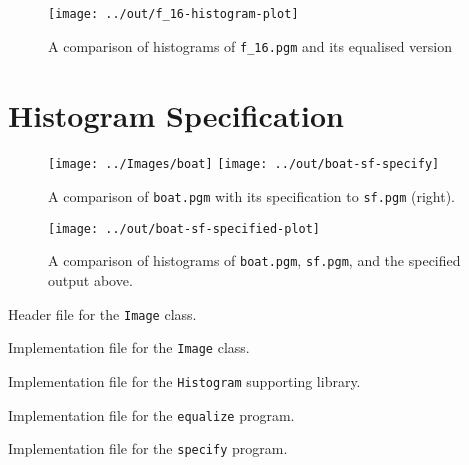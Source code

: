 \documentclass[headings=optiontoheadandtoc,listof=totoc]{scrartcl}
\newenvironment{longlisting}{\captionsetup{type=listing}}{}
\begin{document}
\begin{figure}[H]
	\centering\texttt{[image: ../out/f\_16-histogram-plot]}
	\caption{A comparison of histograms of \texttt{f\_16.pgm} and its equalised version}
\end{figure}

\section{Histogram Specification}

\begin{figure}[H]
	\centering
	\texttt{[image: ../Images/boat]}
	\texttt{[image: ../out/boat-sf-specify]}
	\caption{A comparison of \texttt{boat.pgm} with its specification to \texttt{sf.pgm} (right).}
\end{figure}

\begin{figure}[H]
	\centering\texttt{[image: ../out/boat-sf-specified-plot]}
	\caption{A comparison of histograms of \texttt{boat.pgm}, \texttt{sf.pgm}, and the specified output above.}
\end{figure}

\clearpage
\listoflistings

\begin{longlisting}
	\caption{Header file for the \texttt{Image} class.}
\end{longlisting}

\begin{longlisting}
	\caption{Implementation file for the \texttt{Image} class.}
\end{longlisting}

\begin{longlisting}
	\caption{Implementation file for the \texttt{Histogram} supporting library.}
\end{longlisting}

\begin{longlisting}
	\caption{Implementation file for the \texttt{equalize} program.}
\end{longlisting}

\begin{longlisting}
	\caption{Implementation file for the \texttt{specify} program.}
\end{longlisting}
\end{document}
